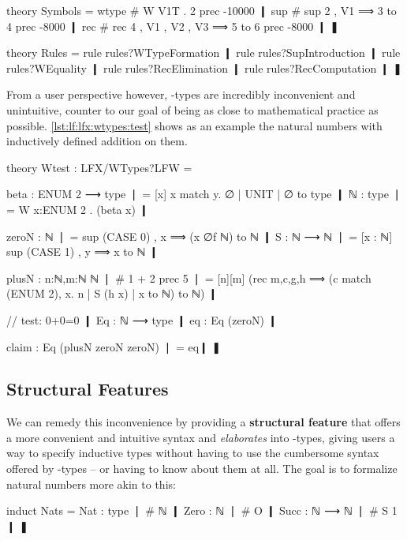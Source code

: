 \begin{mmtcode}[caption={Theories for \wtypesym-types\protect\footnotemark},label=lst:lf:lfx:wtypes:theory]
theory Symbols =
  wtype # W V1T . 2 prec -10000 ❙
  sup # sup 2 , V1 ⟹ 3 to 4 prec -8000 ❙
  rec # rec 4 , V1 , V2 , V3 ⟹ 5 to 6  prec -8000 ❙
❚
	
theory Rules =   
   rule rules?WTypeFormation ❙
   rule rules?SupIntroduction ❙
   rule rules?WEquality ❙
   rule rules?RecElimination ❙
   rule rules?RecComputation ❙
❚
\end{mmtcode}
	
From a user perspective however, \wtypesym-types are incredibly inconvenient and unintuitive, counter to our goal of being as close to mathematical practice as possible. \autoref{lst:lf:lfx:wtypes:test} shows as an example the natural numbers with inductively defined addition on them.

\begin{mmtcode}[caption={Natural Numbers on \wtypesym-types\protect\footnotemark},label=lst:lf:lfx:wtypes:test]
theory Wtest : LFX/WTypes?LFW =
	
  beta : ENUM 2 ⟶ type ❘ 
    = [x] x match y. ∅ | UNIT | ∅  to type ❙
  ℕ : type ❘ = W x:ENUM 2 . (beta x) ❙
	
  zeroN : ℕ 	❘ = sup (CASE 0) , x ⟹ (x ∅f ℕ) to ℕ 	❙
  S : ℕ ⟶ ℕ 	❘ = [x : ℕ] sup (CASE 1) , y ⟹ x to ℕ 	❙
	
  plusN : {n:ℕ,m:ℕ} ℕ ❘ # 1 + 2 prec 5 ❘ 
    = [n][m] (rec m,c,g,h ⟹ (c match  (ENUM 2), x. n | S (h x) | x to ℕ) to ℕ) ❙
		
  // test: 0+0=0 ❙
  Eq : ℕ ⟶ type ❙
  eq : Eq (zeroN) ❙

  claim : Eq (plusN zeroN zeroN) ❘ = eq❙
❚
\end{mmtcode}

\subsection{Structural Features}\label{sec:lf:lfx:wtypes:sf}

We can remedy this inconvenience by providing a \textbf{structural feature} that offers a more convenient and intuitive syntax and \emph{elaborates} into \wtypesym-types, giving users a way to specify inductive types without having to use the cumbersome syntax offered by \wtypesym-types -- or having to know about them at all. The goal is to formalize natural numbers more akin to this:
\begin{mmtcode}
induct Nats =
  Nat  : type 	❘ # ℕ 	❙
  Zero : ℕ	❘ # O 	❙
  Succ : ℕ ⟶ ℕ 	❘ # S 1 ❙
❚
\end{mmtcode}

